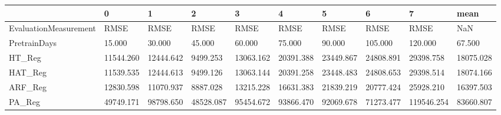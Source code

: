 \begin{tabular}{llllllllll}
\toprule
{} &         0 &         1 &         2 &         3 &         4 &         5 &         6 &          7 &      mean \\
\midrule
EvaluationMeasurement &      RMSE &      RMSE &      RMSE &      RMSE &      RMSE &      RMSE &      RMSE &       RMSE &       NaN \\
PretrainDays          &    15.000 &    30.000 &    45.000 &    60.000 &    75.000 &    90.000 &   105.000 &    120.000 &    67.500 \\
HT\_Reg                & 11544.260 & 12444.642 &  9499.253 & 13063.162 & 20391.388 & 23449.867 & 24808.891 &  29398.758 & 18075.028 \\
HAT\_Reg               & 11539.535 & 12444.613 &  9499.126 & 13063.144 & 20391.258 & 23448.483 & 24808.653 &  29398.514 & 18074.166 \\
ARF\_Reg               & 12830.598 & 11070.937 &  8887.028 & 13215.228 & 16631.383 & 21839.219 & 20777.424 &  25928.210 & 16397.503 \\
PA\_Reg                & 49749.171 & 98798.650 & 48528.087 & 95454.672 & 93866.470 & 92069.678 & 71273.477 & 119546.254 & 83660.807 \\
\bottomrule
\end{tabular}
